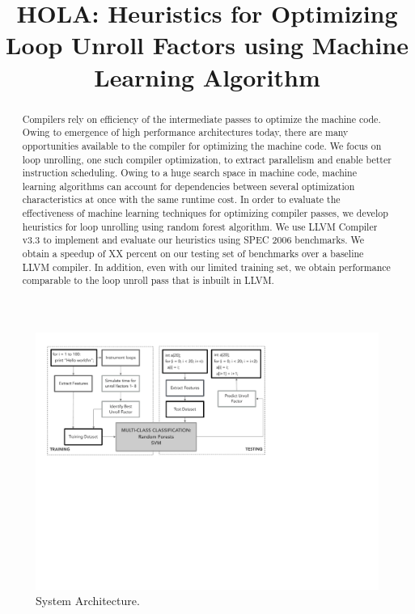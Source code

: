 \documentclass[]{sig-alternate}
\begin{document}
\title{HOLA: Heuristics for Optimizing Loop Unroll Factors using Machine Learning Algorithm\\\vspace{-4mm}}
\makeatletter
\def\@copyrightspace{\relax}
\makeatother

\maketitle

\begin{abstract}
Compilers rely on efficiency of the intermediate passes to optimize the machine code. Owing to emergence of high performance architectures today, there are many opportunities available to the compiler for optimizing the machine code. We focus on loop unrolling, one such compiler optimization, to extract parallelism and enable better instruction scheduling. Owing to a huge search space in machine code, machine learning algorithms can account for dependencies between several optimization characteristics at once with the same runtime cost. In order to evaluate the effectiveness of machine learning techniques for optimizing compiler passes, we develop heuristics for loop unrolling using random forest algorithm.  We use LLVM Compiler v3.3 to implement and evaluate our heuristics using SPEC 2006 benchmarks. We obtain a speedup of XX percent on our testing set of benchmarks over a baseline LLVM compiler. In addition, even with our limited training set, we obtain performance comparable to the loop unroll pass that is inbuilt in LLVM.
\end{abstract}
\begin{figure}
  \center
  \includegraphics[width=0.9\linewidth]{fig/systemArchitecture.pdf}
  \caption{System Architecture.}
  \label{fig:systemArchitecture}
\end{figure}
\end{document}
